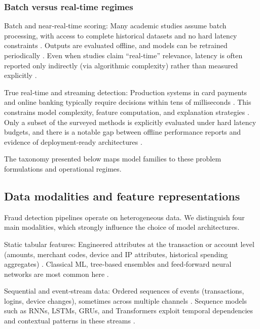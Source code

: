 \documentclass[a4paper,fleqn]{cas-dc}
\begin{document}
\subsubsection{Batch versus real‑time regimes}
Batch and near‑real‑time scoring: Many academic studies assume batch processing, with access to complete historical datasets and no hard latency constraints \cite{van_belle_shine_2024, wu_heterogeneous_2024, li_fedgat-dcnn_2024}. 
Outputs are evaluated offline, and models can be retrained periodically \cite{van_belle_shine_2024}. 
Even when studies claim “real‑time” relevance, latency is often reported only indirectly (via algorithmic complexity) rather than measured explicitly \cite{van_belle_shine_2024}.

True real‑time and streaming detection: Production systems in card payments and online banking typically require decisions within tens of milliseconds \cite{alarfaj_enhancing_2025, van_belle_shine_2024}. 
This constrains model complexity, feature computation, and explanation strategies \cite{li_fedgat-dcnn_2024}. 
Only a subset of the surveyed methods is explicitly evaluated under hard latency budgets, and there is a notable gap between offline performance reports and evidence of deployment‑ready architectures \cite{li_fedgat-dcnn_2024, van_belle_shine_2024, plakandaras_credit_2022, sobana_sophisticated_2025}.

The taxonomy presented below maps model families to these problem formulations and operational regimes.

\subsection{Data modalities and feature representations}
Fraud detection pipelines operate on heterogeneous data. 
We distinguish four main modalities, which strongly influence the choice of model architectures.

Static tabular features: Engineered attributes at the transaction or account level (amounts, merchant codes, device and IP attributes, historical spending aggregates) \cite{almazroi_online_2023, alfaiz_enhanced_2022, ravindranath_evaluation_2024, sobana_sophisticated_2025}. 
Classical ML, tree‑based ensembles and feed‑forward neural networks are most common here \cite{almazroi_online_2023, alfaiz_enhanced_2022, zhao_improved_2024}.

Sequential and event‑stream data: Ordered sequences of events (transactions, logins, device changes), sometimes across multiple channels \cite{zioviris_intelligent_2024, alam_intelligent_2023, akour_hybrid_2025, deng_transformer-based_2025, wei_evaluation_2023}. 
Sequence models such as RNNs, LSTMs, GRUs, and Transformers exploit temporal dependencies and contextual patterns in these streams \cite{zioviris_intelligent_2024, akour_hybrid_2025, deng_transformer-based_2025, alam_intelligent_2023}.
\end{document}
